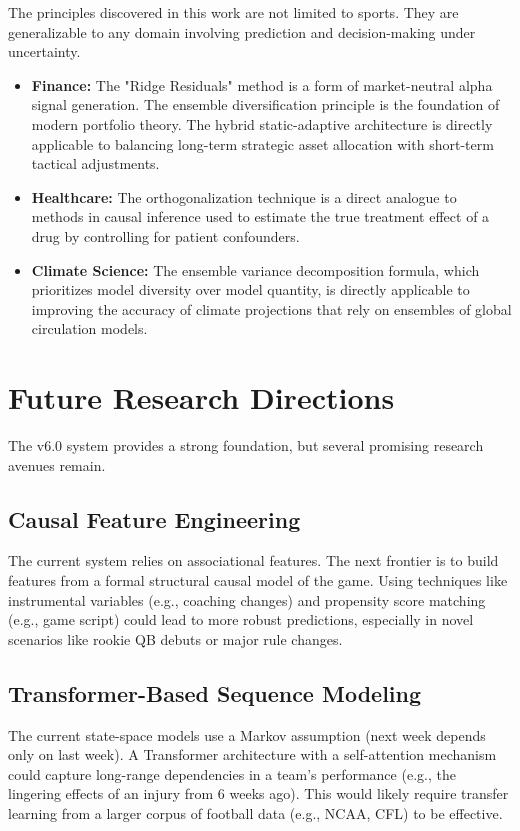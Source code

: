 The principles discovered in this work are not limited to sports. They are generalizable to any domain involving prediction and decision-making under uncertainty.

\begin{itemize}
    \item \textbf{Finance:} The "Ridge Residuals" method is a form of market-neutral alpha signal generation. The ensemble diversification principle is the foundation of modern portfolio theory. The hybrid static-adaptive architecture is directly applicable to balancing long-term strategic asset allocation with short-term tactical adjustments.

    \item \textbf{Healthcare:} The orthogonalization technique is a direct analogue to methods in causal inference used to estimate the true treatment effect of a drug by controlling for patient confounders.

    \item \textbf{Climate Science:} The ensemble variance decomposition formula, which prioritizes model diversity over model quantity, is directly applicable to improving the accuracy of climate projections that rely on ensembles of global circulation models.
\end{itemize}

\section{Future Research Directions}
\label{sec:future-research-condensed}

The v6.0 system provides a strong foundation, but several promising research avenues remain.

\subsection{Causal Feature Engineering}
The current system relies on associational features. The next frontier is to build features from a formal structural causal model of the game. Using techniques like instrumental variables (e.g., coaching changes) and propensity score matching (e.g., game script) could lead to more robust predictions, especially in novel scenarios like rookie QB debuts or major rule changes.

\subsection{Transformer-Based Sequence Modeling}
The current state-space models use a Markov assumption (next week depends only on last week). A Transformer architecture with a self-attention mechanism could capture long-range dependencies in a team's performance (e.g., the lingering effects of an injury from 6 weeks ago). This would likely require transfer learning from a larger corpus of football data (e.g., NCAA, CFL) to be effective.

